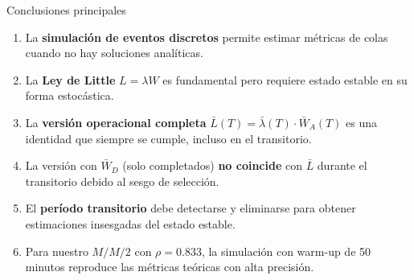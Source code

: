 \documentclass[aspectratio=1610, 9pt]{beamer}
\begin{document}
\begin{frame}{Conclusiones principales}

\begin{enumerate}
    \item La \textbf{simulación de eventos discretos} permite estimar métricas de colas cuando no hay soluciones analíticas.
    
    \vspace{0.2cm}
    \item La \textbf{Ley de Little} $L = \lambda W$ es fundamental pero requiere estado estable en su forma estocástica.
    
    \vspace{0.2cm}
    \item La \textbf{versión operacional completa} $\bar{L}(T) = \bar{\lambda}(T)\cdot\bar{W}_A(T)$ es una identidad que siempre se cumple, incluso en el transitorio.
    
    \vspace{0.2cm}
    \item La versión con $\bar{W}_D$ (solo completados) \textbf{no coincide} con $\bar{L}$ durante el transitorio debido al sesgo de selección.
    
    \vspace{0.2cm}
    \item El \textbf{período transitorio} debe detectarse y eliminarse para obtener estimaciones insesgadas del estado estable.
    
    \vspace{0.2cm}
    \item Para nuestro $M/M/2$ con $\rho = 0.833$, la simulación con warm-up de 50 minutos reproduce las métricas teóricas con alta precisión.
\end{enumerate}
\end{frame}
\end{document}
